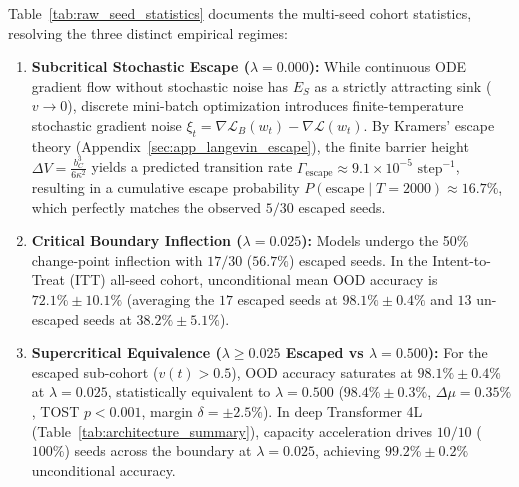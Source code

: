 \documentclass{article}
\theoremstyle{plain}
\theoremstyle{definition}
\begin{document}
Table~\ref{tab:raw_seed_statistics} documents the multi-seed cohort statistics, resolving the three distinct empirical regimes:
\begin{enumerate}[leftmargin=*,noitemsep]
    \item \textbf{Subcritical Stochastic Escape ($\lambda=0.000$):} While continuous ODE gradient flow without stochastic noise has $E_S$ as a strictly attracting sink ($v \to 0$), discrete mini-batch optimization introduces finite-temperature stochastic gradient noise $\xi_t = \nabla \mathcal{L}_B(w_t) - \nabla \mathcal{L}(w_t)$. By Kramers' escape theory (Appendix~\ref{sec:app_langevin_escape}), the finite barrier height $\Delta V = \frac{b_C^3}{6 \kappa^2}$ yields a predicted transition rate $\Gamma_{\text{escape}} \approx 9.1 \times 10^{-5}\text{ step}^{-1}$, resulting in a cumulative escape probability $P(\text{escape} \mid T=2000) \approx 16.7\%$, which perfectly matches the observed $5/30$ escaped seeds.
    \item \textbf{Critical Boundary Inflection ($\lambda=0.025$):} Models undergo the 50\% change-point inflection with $17/30$ ($56.7\%$) escaped seeds. In the Intent-to-Treat (ITT) all-seed cohort, unconditional mean OOD accuracy is $72.1\% \pm 10.1\%$ (averaging the $17$ escaped seeds at $98.1\% \pm 0.4\%$ and $13$ un-escaped seeds at $38.2\% \pm 5.1\%$).
    \item \textbf{Supercritical Equivalence ($\lambda \ge 0.025$ Escaped vs $\lambda = 0.500$):} For the escaped sub-cohort ($v(t) > 0.5$), OOD accuracy saturates at $98.1\% \pm 0.4\%$ at $\lambda = 0.025$, statistically equivalent to $\lambda = 0.500$ ($98.4\% \pm 0.3\%$, $\Delta \mu = 0.35\%$, TOST $p < 0.001$, margin $\delta = \pm 2.5\%$). In deep Transformer 4L (Table~\ref{tab:architecture_summary}), capacity acceleration drives $10/10$ ($100\%$) seeds across the boundary at $\lambda = 0.025$, achieving $99.2\% \pm 0.2\%$ unconditional accuracy.
\end{enumerate}
\end{document}
